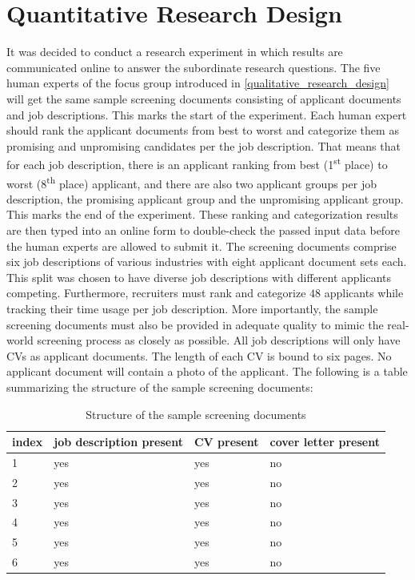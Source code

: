 \documentclass[draft,final]{thesisclass} %
\begin{document}
\section{Quantitative Research Design} \label{quantitative_research_design}
It was decided to conduct a research experiment in which results are communicated online to answer the subordinate research questions.
The five human experts of the focus group introduced in \ref{qualitative_research_design} will get the same sample screening documents consisting of applicant documents and job descriptions.
This marks the start of the experiment.
Each human expert should rank the applicant documents from best to worst and categorize them as promising and unpromising candidates per the job description.
That means that for each job description, there is an applicant ranking from best (1\textsuperscript{st} place) to worst (8\textsuperscript{th} place) applicant, and there are also two applicant groups per job description, the promising applicant group and the unpromising applicant group.
This marks the end of the experiment.
These ranking and categorization results are then typed into an online form to double-check the passed input data before the human experts are allowed to submit it.
The screening documents comprise six job descriptions of various industries with eight applicant document sets each.
This split was chosen to have diverse job descriptions with different applicants competing.
Furthermore, recruiters must rank and categorize $48$ applicants while tracking their time usage per job description.
More importantly, the sample screening documents must also be provided in adequate quality to mimic the real-world screening process as closely as possible.
All job descriptions will only have \acs{CV}s as applicant documents.
The length of each \acs{CV} is bound to six pages.
No applicant document will contain a photo of the applicant.
The following is a table summarizing the structure of the sample screening documents:
\begin{table}[H]
    \centering{}
    \begin{tabular}{|l|l|l|l|}
    \hline
    \textbf{index} & \textbf{job description present} & \textbf{\acs{CV} present} & \textbf{cover letter present} \\ \hline
    1 & yes & yes & no \\ \hline
    2 & yes & yes & no \\ \hline
    3 & yes & yes & no \\ \hline
    4 & yes & yes & no \\ \hline
    5 & yes & yes & no \\ \hline
    6 & yes & yes & no \\ \hline
    \end{tabular}
    \caption{Structure of the sample screening documents}
\end{table}
\end{document}
